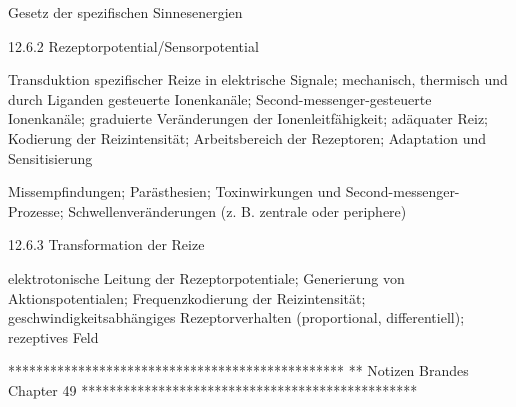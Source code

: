         Gesetz der spezifischen Sinnesenergien
        
    12.6.2 Rezeptorpotential/Sensorpotential
    
        Transduktion spezifischer Reize in elektrische Signale; mechanisch, thermisch und durch Liganden gesteuerte Ionenkanäle; Second-messenger-gesteuerte Ionenkanäle; graduierte Veränderungen der Ionenleitfähigkeit; adäquater Reiz; Kodierung der Reizintensität; Arbeitsbereich der Rezeptoren; Adaptation und Sensitisierung
        
        Missempfindungen; Parästhesien; Toxinwirkungen und Second-messenger-Prozesse; Schwellenveränderungen (z. B. zentrale oder periphere)
        
    12.6.3 Transformation der Reize

        elektrotonische Leitung der Rezeptorpotentiale; Generierung von Aktionspotentialen; Frequenzkodierung der Reizintensität; geschwindigkeitsabhängiges Rezeptorverhalten (proportional, differentiell); rezeptives Feld
        
        



************************************************
** Notizen Brandes Chapter 49
************************************************

